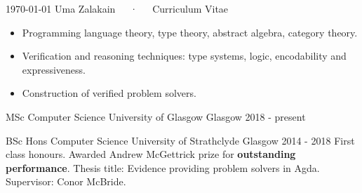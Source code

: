 \documentclass[11pt, a4paper]{awesome-cv}
\begin{document}
\makecvheader

\makecvfooter
  {\today}
  {Uma Zalakain~~~·~~~Curriculum Vitae}
  {\thepage}




\begin{itemize}[noitemsep,wide=0pt]
    \item {Programming language theory, type theory, abstract algebra, category
        theory.}
    \item {Verification and reasoning techniques: type systems, logic,
        encodability and expressiveness.}
    \item {Construction of verified problem solvers.}
\end{itemize}


\begin{cventries}
    \cventry
      {MSc Computer Science} %
      {University of Glasgow} %
      {Glasgow} %
      {2018 - present} %
      {}

    \cventry
      {BSc Hons Computer Science} %
      {University of Strathclyde} %
      {Glasgow} %
      {2014 - 2018} %
      {
          First class honours. Awarded Andrew McGettrick prize for
          \textbf{outstanding performance}.\newline
          Thesis title: Evidence providing problem solvers in Agda.\newline
          Supervisor: Conor McBride.
      }
\end{cventries}

\end{document}
